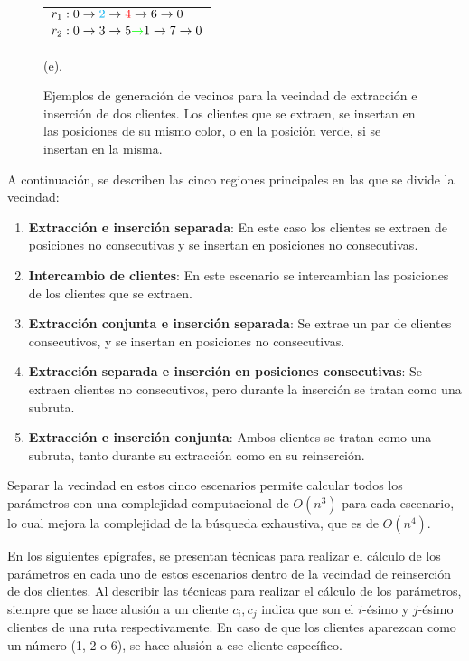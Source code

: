 \documentclass[12pt]{report}
\begin{document}
\begin{figure}[!h]
\begin{minipage}{0.45\textwidth}
			\centering
			\begin{tabular}{l}
				$r_1:0 \rightarrow \textcolor{cyan}{2} \rightarrow \textcolor{red}{4} \rightarrow 6 \rightarrow 0$ \\
				$r_2:0 \rightarrow 3 \rightarrow 5 \textcolor{green}{\rightarrow} 1 \rightarrow 7 \rightarrow 0$
			\end{tabular}
			\caption*{(e).}
		\end{minipage}
		\caption{Ejemplos de generación de vecinos para la vecindad de extracción e inserción de dos clientes. Los clientes que se extraen, se insertan en las posiciones de su mismo color, o en la posición verde, si se insertan en la misma.}
		\label{fig:generacion de vecinos}
	\end{figure}

	 A continuación, se describen las cinco regiones principales en las que se divide la vecindad:

	\begin{enumerate}
		\item \textbf{Extracción e inserción separada}: En este caso los clientes se extraen de posiciones no consecutivas y se insertan en posiciones no consecutivas.
		\item \textbf{Intercambio de clientes}: En este escenario se intercambian las posiciones de los clientes que se extraen.
		\item \textbf{Extracción conjunta e inserción separada}: Se extrae un par de clientes consecutivos, y se insertan en posiciones no consecutivas.
		\item \textbf{Extracción separada e inserción en posiciones consecutivas}: Se extraen clientes no consecutivos, pero durante la inserción se tratan como una subruta.
		\item \textbf{Extracción e inserción conjunta}: Ambos clientes se tratan como una subruta, tanto durante su extracción como en su reinserción.

              \end{enumerate}

	Separar la vecindad en estos cinco escenarios permite calcular todos los parámetros con una complejidad computacional de $O(n^3)$ para cada escenario, lo cual mejora la complejidad de la búsqueda exhaustiva, que es de $O(n^4)$.

	En los siguientes epígrafes, se presentan técnicas para realizar el cálculo de los parámetros en cada uno de estos escenarios dentro de la vecindad de reinserción de dos clientes. Al describir las técnicas para realizar el cálculo de los parámetros, siempre que se hace alusión a un cliente $c_i, c_j$ indica que son el $i$-ésimo y $j$-ésimo clientes de una ruta respectivamente. En caso de que los clientes aparezcan como un número (1, 2 o 6), se hace alusión a ese cliente específico.
\end{document}
